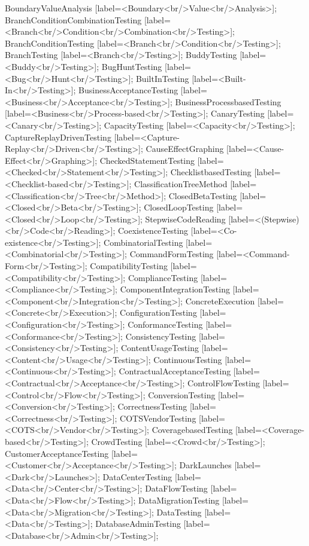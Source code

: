 \documentclass{article}
\begin{document}
{BoundaryValueAnalysis [label=<Boundary<br/>Value<br/>Analysis>];
BranchConditionCombinationTesting [label=<Branch<br/>Condition<br/>Combination<br/>Testing>];
BranchConditionTesting [label=<Branch<br/>Condition<br/>Testing>];
BranchTesting [label=<Branch<br/>Testing>];
BuddyTesting [label=<Buddy<br/>Testing>];
BugHuntTesting [label=<Bug<br/>Hunt<br/>Testing>];
BuiltInTesting [label=<Built-In<br/>Testing>];
BusinessAcceptanceTesting [label=<Business<br/>Acceptance<br/>Testing>];
BusinessProcessbasedTesting [label=<Business<br/>Process-based<br/>Testing>];
CanaryTesting [label=<Canary<br/>Testing>];
CapacityTesting [label=<Capacity<br/>Testing>];
CaptureReplayDrivenTesting [label=<Capture-Replay<br/>Driven<br/>Testing>];
CauseEffectGraphing [label=<Cause-Effect<br/>Graphing>];
CheckedStatementTesting [label=<Checked<br/>Statement<br/>Testing>];
ChecklistbasedTesting [label=<Checklist-based<br/>Testing>];
ClassificationTreeMethod [label=<Classification<br/>Tree<br/>Method>];
ClosedBetaTesting [label=<Closed<br/>Beta<br/>Testing>];
ClosedLoopTesting [label=<Closed<br/>Loop<br/>Testing>];
StepwiseCodeReading [label=<(Stepwise)<br/>Code<br/>Reading>];
CoexistenceTesting [label=<Co-existence<br/>Testing>];
CombinatorialTesting [label=<Combinatorial<br/>Testing>];
CommandFormTesting [label=<Command-Form<br/>Testing>];
CompatibilityTesting [label=<Compatibility<br/>Testing>];
ComplianceTesting [label=<Compliance<br/>Testing>];
ComponentIntegrationTesting [label=<Component<br/>Integration<br/>Testing>];
ConcreteExecution [label=<Concrete<br/>Execution>];
ConfigurationTesting [label=<Configuration<br/>Testing>];
ConformanceTesting [label=<Conformance<br/>Testing>];
ConsistencyTesting [label=<Consistency<br/>Testing>];
ContentUsageTesting [label=<Content<br/>Usage<br/>Testing>];
ContinuousTesting [label=<Continuous<br/>Testing>];
ContractualAcceptanceTesting [label=<Contractual<br/>Acceptance<br/>Testing>];
ControlFlowTesting [label=<Control<br/>Flow<br/>Testing>];
ConversionTesting [label=<Conversion<br/>Testing>];
CorrectnessTesting [label=<Correctness<br/>Testing>];
COTSVendorTesting [label=<COTS<br/>Vendor<br/>Testing>];
CoveragebasedTesting [label=<Coverage-based<br/>Testing>];
CrowdTesting [label=<Crowd<br/>Testing>];
CustomerAcceptanceTesting [label=<Customer<br/>Acceptance<br/>Testing>];
DarkLaunches [label=<Dark<br/>Launches>];
DataCenterTesting [label=<Data<br/>Center<br/>Testing>];
DataFlowTesting [label=<Data<br/>Flow<br/>Testing>];
DataMigrationTesting [label=<Data<br/>Migration<br/>Testing>];
DataTesting [label=<Data<br/>Testing>];
DatabaseAdminTesting [label=<Database<br/>Admin<br/>Testing>];
}
\end{document}
